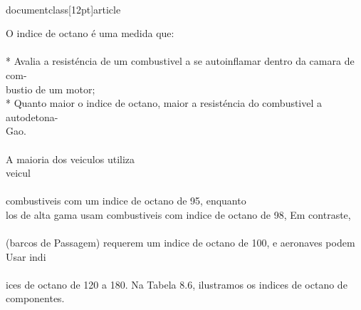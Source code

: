 \\documentclass[12pt]{article}
\begin{document}
O indice de octano é uma medida que:\\
\\
* Avalia a resisténcia de um combustivel a se autoinflamar dentro da camara de com-\\
bustio de um motor;\\
* Quanto maior o indice de octano, maior a resisténcia do combustivel a autodetona-\\
Gao.\\
\\
A maioria dos veiculos utiliza\\
veicul\\
\\
combustiveis com um indice de octano de 95, enquanto\\
los de alta gama usam combustiveis com indice de octano de 98, Em contraste,\\
\\
(barcos de Passagem) requerem um indice de octano de 100, e aeronaves podem\\
Usar indi\\
\\
ices de octano de 120 a 180. Na Tabela 8.6, ilustramos os indices de octano de\\
componentes.\\
\\
\end{document}
